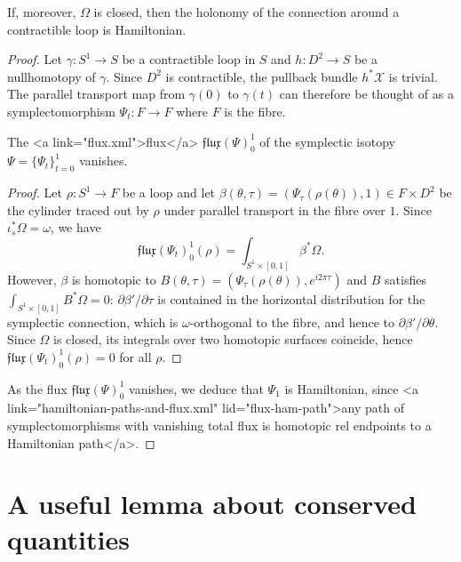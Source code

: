 \documentclass{article}
\begin{document}
\begin{Lemma}
  If, moreover, $\Omega$ is closed, then the holonomy of the connection around a contractible loop is Hamiltonian.
\end{Lemma}
\begin{proof}
  Let $\gamma\colon S^1\to S$ be a contractible loop in $S$ and $h\colon D^2\to S$ be a nullhomotopy of $\gamma$. Since $D^2$ is contractible, the pullback bundle $h^*\mathcal{X}$ is trivial. The parallel transport map from $\gamma(0)$ to $\gamma(t)$ can therefore be thought of as a symplectomorphism $\Psi_t\colon F\to F$ where $F$ is the fibre.

  \begin{Claim}
    The <a link="flux.xml">flux</a> $\mathfrak{flux}(\Psi)_0^1$ of the symplectic isotopy $\Psi=\{\Psi_t\}_{t=0}^1$ vanishes.
  \end{Claim}
  \begin{proof}
    Let $\rho\colon S^1\to F$ be a loop and let $\beta(\theta,\tau)=(\Psi_\tau(\rho(\theta)),1)\in F\times D^2$ be the cylinder traced out by $\rho$ under parallel transport in the fibre over $1$. Since $\iota_s^*\Omega=\omega$, we have
    \[\mathfrak{flux}(\Psi_t)_0^1(\rho)=\int_{S^1\times[0,1]}\beta^*\Omega.\]
    However, $\beta$ is homotopic to $B(\theta,\tau)=(\Psi_\tau(\rho(\theta)),e^{i2\pi \tau})$ and $B$ satisfies $\int_{S^1\times[0,1]} B^*\Omega=0$: $\partial\beta'/\partial\tau$ is contained in the horizontal distribution for the symplectic connection, which is $\omega$-orthogonal to the fibre, and hence to $\partial\beta'/\partial\theta$. Since $\Omega$ is closed, its integrals over two homotopic surfaces coincide, hence $\mathfrak{flux}(\Psi_t)_0^1(\rho)=0$ for all $\rho$.
  \end{proof}

   As the flux $\mathfrak{flux}(\Psi)_0^1$ vanishes, we deduce that $\Psi_1$ is Hamiltonian, since <a link="hamiltonian-paths-and-flux.xml" lid="flux-ham-path">any path of symplectomorphisms with vanishing total flux is homotopic rel endpoints to a Hamiltonian path</a>.
\end{proof}


\section{A useful lemma about conserved quantities}
\end{document}

